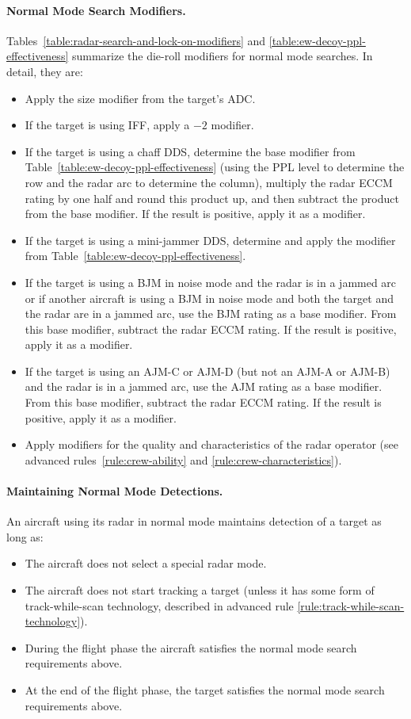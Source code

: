 {\paragraph{Normal Mode Search Modifiers.} Tables~\ref{table:radar-search-and-lock-on-modifiers} and \ref{table:ew-decoy-ppl-effectiveness} summarize the die-roll modifiers for normal mode searches. In detail, they are:
\begin{itemize}
    \item Apply the size modifier from the target’s ADC.
    \item If the target is using IFF, apply a $-2$ modifier.
    \item If the target is using a chaff DDS, determine the base modifier from Table~\ref{table:ew-decoy-ppl-effectiveness} (using the PPL level to determine the row and the radar arc to determine the column), multiply the radar ECCM rating by one half and round this product up, and then subtract the product from the base modifier. If the result is positive, apply it as a modifier.
    \item If the target is using a mini-jammer DDS, determine and apply the modifier from Table~\ref{table:ew-decoy-ppl-effectiveness}.
    \item If the target is using a BJM in noise mode and the radar is in a jammed arc or if another aircraft is using a BJM in noise mode and both the target and the radar are in a jammed arc, use the BJM rating as a base modifier. From this base modifier, subtract the radar ECCM rating. If the result is positive, apply it as a modifier.
    \item If the target is using an AJM-C or AJM-D (but not an AJM-A or AJM-B) and the radar is in a jammed arc, use the AJM rating as a base modifier. From this base modifier, subtract the radar ECCM rating. If the result is positive, apply it as a modifier.
    \item Apply modifiers for the quality and characteristics of the radar operator (see advanced rules~\ref{rule:crew-ability} and \ref{rule:crew-characteristics}). 
\end{itemize}

\paragraph{Maintaining Normal Mode Detections.} An aircraft using its radar in normal mode maintains detection of a target as long as:
\begin{itemize}
\item The aircraft does not select a special radar mode.
\item The aircraft does not start tracking a target (unless it has some form of track-while-scan technology, described in advanced rule \ref{rule:track-while-scan-technology}).
\item During the flight phase the aircraft satisfies the normal mode search requirements above.
\item At the end of the flight phase, the target satisfies the normal mode search requirements above.
\end{itemize}

}
